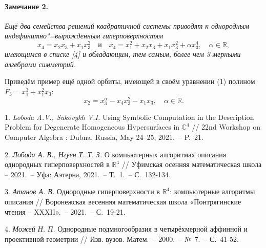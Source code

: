 \paragraph{Замечание 2.} {\it
	Ещё два семейства решений квадратичной системы приводят к однородным индефинитно"=вырожденным гиперповерхностям
	\begin{equation*}
		x_4 = x_2 x_3 + x_1 x_3^2 \quad \text{и} \quad x_4 = x_1^2 + x_2 x_3 + x_1 x_3^2 + \alpha x_3^4,  \quad \alpha \in \mathbb{R},
	\end{equation*}
	имеющимся в списке [4] и обладающим, тем самым, более чем 3-мерными алгебрами симметрий.
}

Приведём пример ещё одной орбиты, имеющей в своём уравнении (1) полином $F_3 = x_1^3 + x_1^2x_3$: \begin{equation*}
	x_2 = x_3^{\alpha} - x_4x_3^2 - x_1x_3, \quad \alpha \in \mathbb{R}.
\end{equation*}

\litlist

1. {\it Loboda A.V., Sukovykh V.I.} Using Symbolic Computation in the Description
Problem for Degenerate Homogeneous Hy\-per\-sur\-fa\-ces in $\mathbb{C}^4$ // 22nd Workshop on Computer Algebra : Dubna, Russia, May 24–25, 2021.~-- P.~21.

2. {\it Лобода А. В., Нгуен Т. Т. З.} О компьютерных алгоритмах описания однородных гиперповерхностей в $\mathbb{R}^4$ // Уфимская осенняя математическая школа -- 2021.~-- Уфа: Аэтерна, 2021.~-- Т.~1.~-- С.~132-134.

3. {\it Атанов А. В.} Однородные гиперповерхности в $\mathbb{R}^4$: компьютерные алгоритмы описания // Воронежская весенняя математическая школа «Понтрягинские чтения -- {XXXII}».~-- 2021.~-- С.~19-21.

4. {\it Можей Н. П.} Однородные подмногообразия в четырёхмерной аффинной и проективной геометрии // Изв. вузов. Матем.~-- 2000.~-- №~7.~-- С.~41-52.
